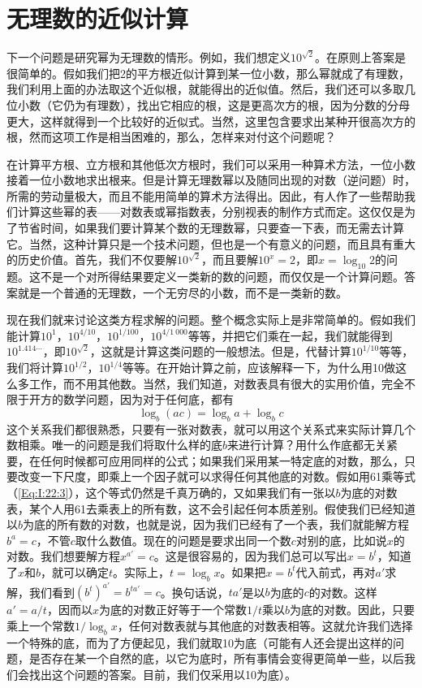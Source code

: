 \section{无理数的近似计算}

下一个问题是研究幂为无理数的情形。例如，我们想定义$10^{\sqrt{2}}$。在原则上答案是很简单的。假如我们把2的平方根近似计算到某一位小数，那么幂就成了有理数，我们利用上面的办法取这个近似根，就能得出的近似值。然后，我们还可以多取几位小数（它仍为有理数），找出它相应的根，这是更高次方的根，因为分数的分母更大，这样就得到一个比较好的近似式。当然，这里包含要求出某种开很高次方的根，然而这项工作是相当困难的，那么，怎样来对付这个问题呢？

在计算平方根、立方根和其他低次方根时，我们可以采用一种算术方法，一位小数接着一位小数地求出根来。但是计算无理数幂以及随同出现的对数（逆问题）时，所需的劳动量极大，而且不能用简单的算术方法得出。因此，有人作了一些帮助我们计算这些幂的表——对数表或幂指数表，分别视表的制作方式而定。这仅仅是为了节省时间，如果我们要计算某个数的无理数幂，只要查一下表，而无需去计算它。当然，这种计算只是一个技术问题，但也是一个有意义的问题，而且具有重大的历史价值。首先，我们不仅要解$10^{\sqrt{2}}$，而且要解$10^x=2$，即$x=\log_{10}2$的问题。这不是一个对所得结果要定义一类新的数的问题，而仅仅是一个计算问题。答案就是一个普通的无理数，一个无穷尽的小数，而不是一类新的数。

现在我们就来讨论这类方程求解的问题。整个概念实际上是非常简单的。假如我们能计算$10^1$，$10^{4/10}$，$10^{1/100}$，$10^{4/1~000}$等等，并把它们乘在一起，我们就能得到$10^{1.414\cdots}$，即$10^{\sqrt{2}}$，这就是计算这类问题的一般想法。但是，代替计算$10^{1/10}$等等，我们将计算$10^{1/2}$，$10^{1/4}$等等。在开始计算之前，应该解释一下，为什么用10做这么多工作，而不用其他数。当然，我们知道，对数表具有很大的实用价值，完全不限于开方的数学问题，因为对于任何底，都有
\begin{equation}
    \label{Eq:I:22:3}
    \log_b(ac)=\log_ba+\log_bc
\end{equation}
这个关系我们都很熟悉，只要有一张对数表，就可以用这个关系式来实际计算几个数相乘。唯一的问题是我们将取什么样的底$b$来进行计算？用什么作底都无关紧要，在任何时候都可应用同样的公式；如果我们采用某一特定底的对数，那么，只要改变一下尺度，即乘上一个因子就可以求得任何其他底的对数。假如用61乘等式（\ref{Eq:I:22:3}），这个等式仍然是千真万确的，又如果我们有一张以$b$为底的对数表，某个人用61去乘表上的所有数，这不会引起任何本质差别。假使我们已经知道以$b$为底的所有数的对数，也就是说，因为我们已经有了一个表，我们就能解方程$b^a=c$，不管$c$取什么数值。现在的问题是要求出同一个数$c$对别的底，比如说$x$的对数。我们想要解方程$x^{a'}=c$。这是很容易的，因为我们总可以写出$x=b^t$，知道了$x$和$b$，就可以确定$t$。实际上，$t=\log_bx$。如果把$x=b^t$代入前式，再对$a'$求解，我们看到$(b^{t})^{a'}=b^{ta'}=c$。换句话说，$t a'$是以$b$为底的$c$的对数。这样$a'=a/t$，因而以$x$为底的对数正好等于一个常数$1/t$乘以$b$为底的对数。因此，只要乘上一个常数$1/\log_bx$，任何对数表就与其他底的对数表相等。这就允许我们选择一个特殊的底，而为了方便起见，我们就取10为底（可能有人还会提出这样的问题，是否存在某一个自然的底，以它为底时，所有事情会变得更简单一些，以后我们会找出这个问题的答案。目前，我们仅采用以10为底）。

